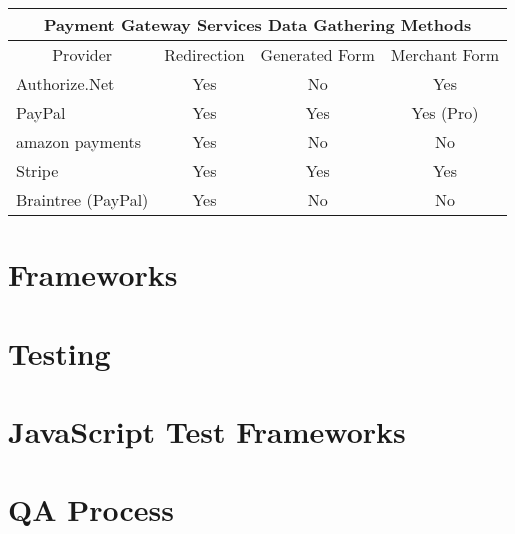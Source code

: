 \begin{center}
\begin{tabular}{ |p{3.5cm}|p{1.75cm}|p{2cm}|p{2cm}|  }
 \hline
 	\multicolumn{4}{|c|}{Payment Gateway Services Data Gathering Methods} \\
 \hline
 	\multicolumn{1}{|c|}{Provider} &
 	\multicolumn{1}{|c|}{Redirection} &
 	\multicolumn{1}{|c|}{Generated Form} &
 	\multicolumn{1}{|c|}{Merchant Form}  \\
 \hline
 	Authorize.Net\cite{authorize-net} & \multicolumn{1}{|c|}{Yes} & \multicolumn{1}{|c|}{No} & \multicolumn{1}{|c|}{Yes} \\
 \hline
 	PayPal\cite{paypal} & \multicolumn{1}{|c|}{Yes} & \multicolumn{1}{|c|}{Yes} & \multicolumn{1}{|c|}{Yes (Pro)} \\
 \hline
 	amazon payments\cite{amazon-payments} & \multicolumn{1}{|c|}{Yes} & \multicolumn{1}{|c|}{No} & \multicolumn{1}{|c|}{No} \\
 \hline
    Stripe\cite{stripe} & \multicolumn{1}{|c|}{Yes} & \multicolumn{1}{|c|}{Yes} & \multicolumn{1}{|c|}{Yes} \\
 \hline
 	Braintree (PayPal)\cite{braintree} & \multicolumn{1}{|c|}{Yes} & \multicolumn{1}{|c|}{No} & \multicolumn{1}{|c|}{No} \\
 \hline
\end{tabular}
\label{tab:gateway-providers}
\vspace{0.4cm}
\end{center}

\section{Frameworks}
\label{sec:frameworks}

\section{Testing}
\label{sec:testing}

\section{JavaScript Test Frameworks}
\label{sec:frameworks}

\section{QA Process}
\label{sec:qa-process}
